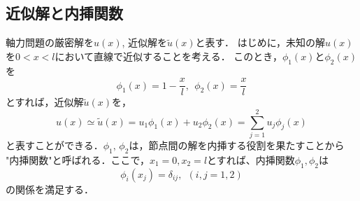 \documentclass[10pt,a4j]{jarticle}
\begin{document}
\subsection{近似解と内挿関数}
軸力問題の厳密解を$u(x)$, 近似解を$\tilde u(x)$と表す．
はじめに，未知の解$u(x)$を$0<x<l$において直線で近似することを考える．
このとき，$\phi_1(x)$と$\phi_2(x)$を
\begin{equation}
	\phi_1(x)= 1-\frac{x}{l}, \ \ 
	\phi_2(x)= \frac{x}{l}
	\label{eqn:basis}
\end{equation}
とすれば，近似解$\tilde u(x)$を，
\begin{equation}
	u(x)\simeq \tilde u (x)=u_1\phi_1(x)+ u_2\phi_2(x)=\sum_{j=1}^2u_j\phi_j(x)
	\label{eqn:u_tilde}
\end{equation}
と表すことができる．$\phi_1,\, \phi_2$は，節点間の解を内挿する役割を果たすことから
"内挿関数"と呼ばれる．ここで，$x_1=0, x_2=l$とすれば、内挿関数$\phi_1,\phi_2$は
\begin{equation}
	\phi_i(x_j)=\delta_{ij}, \ \ (i,j=1,2)
	\label{eqn:phi_01}
\end{equation}
の関係を満足する．
\end{document}
